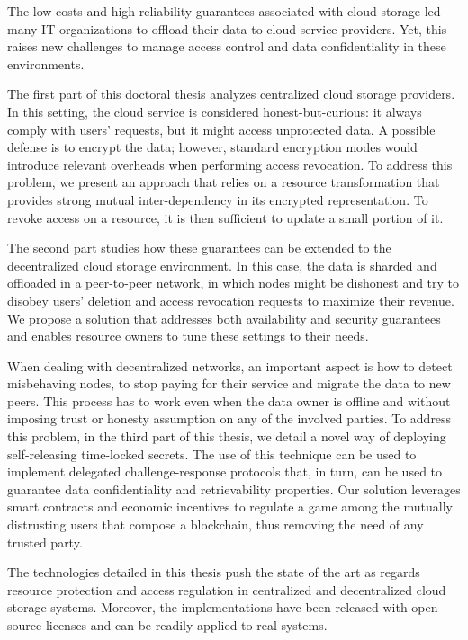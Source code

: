 The low costs and high reliability guarantees associated with cloud storage led
many IT organizations to offload their data to cloud service providers. Yet,
this raises new challenges to manage access control and data confidentiality in
these environments.

The first part of this doctoral thesis analyzes centralized cloud storage
providers. In this setting, the cloud service is considered honest-but-curious:
it always comply with users' requests, but it might access unprotected data. A
possible defense is to encrypt the data; however, standard encryption modes
would introduce relevant overheads when performing access revocation. To
address this problem, we present an approach that relies on a resource
transformation that provides strong mutual inter-dependency in its encrypted
representation. To revoke access on a resource, it is then sufficient to update
a small portion of it.

The second part studies how these guarantees can be extended to the
decentralized cloud storage environment. In this case, the data is sharded and
offloaded in a peer-to-peer network, in which nodes might be dishonest and try
to disobey users' deletion and access revocation requests to maximize their
revenue. We propose a solution that addresses both availability and security
guarantees and enables resource owners to tune these settings to their needs.

When dealing with decentralized networks, an important aspect is how to detect
misbehaving nodes, to stop paying for their service and migrate the data to new
peers. This process has to work even when the data owner is offline and without
imposing trust or honesty assumption on any of the involved parties. To address
this problem, in the third part of this thesis, we detail a novel way of
deploying self-releasing time-locked secrets. The use of this technique can be
used to implement delegated challenge-response protocols that, in turn, can be
used to guarantee data confidentiality and retrievability properties. Our
solution leverages smart contracts and economic incentives to regulate a game
among the mutually distrusting users that compose a blockchain, thus removing
the need of any trusted party.

The technologies detailed in this thesis push the state of the art as regards
resource protection and access regulation in centralized and decentralized
cloud storage systems. Moreover, the implementations have been released with
open source licenses and can be readily applied to real systems.
